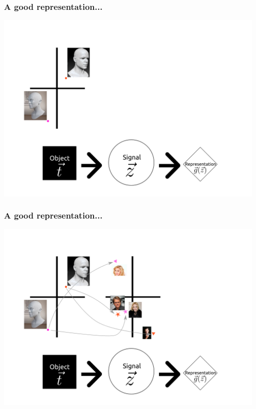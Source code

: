 \documentclass{beamer}
\begin{document}
\begin{frame}
\frametitle{A good representation...}
\begin{center}
\includegraphics[scale = 0.4]{defense_diagrams/geometry1.png}
\end{center}
\end{frame}

\begin{frame}
\frametitle{A good representation...}
\begin{center}
\includegraphics[scale = 0.4]{defense_diagrams/geometry1a.png}
\end{center}
\end{frame}
\end{document}
